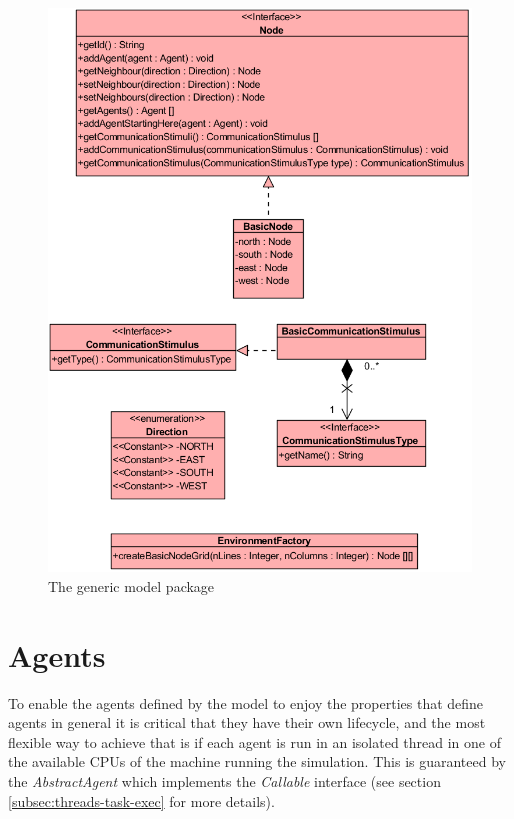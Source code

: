 \begin{figure}[H]
  \centering
  \includegraphics[width=1.0\linewidth]{gfx/uml-env-package.png}
  \caption{The generic model package}
  \label{fig:gen-env-package}
\end{figure}

\section {Agents}
\label{sec:agents}

To enable the agents defined by the model to enjoy the properties that define agents in general it is critical that they have their own lifecycle, and the most flexible way to achieve that is if each agent is run in an isolated thread in one of the available CPUs of the machine running the simulation. This is guaranteed by the \emph{AbstractAgent} which implements the \emph{Callable} interface (see section \ref{subsec:threads-task-exec} for more details).  

